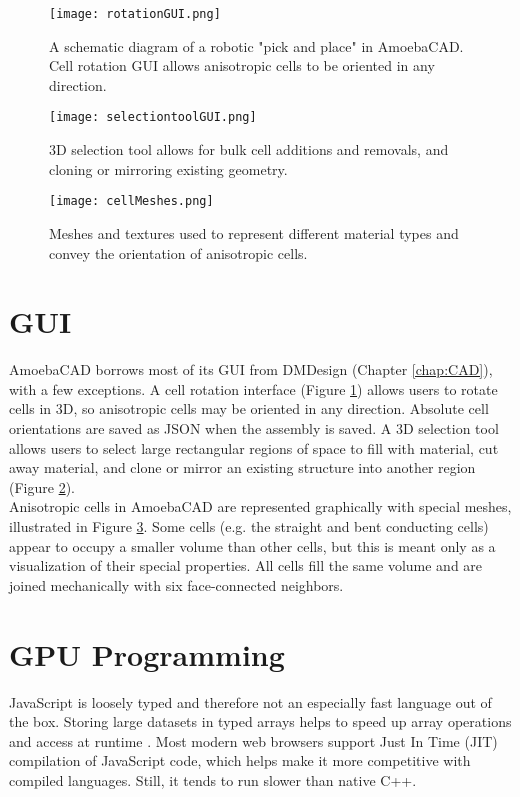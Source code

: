 {\begin{figure}
  \texttt{[image: rotationGUI.png]}
  \caption{A schematic diagram of a robotic "pick and place" in AmoebaCAD.  Cell rotation GUI allows anisotropic cells to be oriented in any direction.}
  \label{fig:rotationGUI}
\end{figure}

\begin{figure}
  \texttt{[image: selectiontoolGUI.png]}
  \caption{3D selection tool allows for bulk cell additions and removals, and cloning or mirroring existing geometry.}
  \label{fig:selectiontoolGUI}
\end{figure}

\begin{figure}
  \texttt{[image: cellMeshes.png]}
  \caption{Meshes and textures used to represent different material types and convey the orientation of anisotropic cells.}
  \label{fig:cellMeshes}
\end{figure}

\section{GUI}

AmoebaCAD borrows most of its GUI from DMDesign (Chapter \ref{chap:CAD}), with a few exceptions.  A cell rotation interface (Figure \ref{fig:rotationGUI}) allows users to rotate cells in 3D, so anisotropic cells may be oriented in any direction.  Absolute cell orientations are saved as JSON when the assembly is saved.  A 3D selection tool allows users to select large rectangular regions of space to fill with material, cut away material, and clone or mirror an existing structure into another region (Figure \ref{fig:selectiontoolGUI}).\\

Anisotropic cells in AmoebaCAD are represented graphically with special meshes, illustrated in Figure \ref{fig:cellMeshes}.  Some cells (e.g. the straight and bent conducting cells) appear to occupy a smaller volume than other cells, but this is meant only as a visualization of their special properties.  All cells fill the same volume and are joined mechanically with six face-connected neighbors.

\section{GPU Programming}

JavaScript is loosely typed and therefore not an especially fast language out of the box.  Storing large datasets in typed arrays helps to speed up array operations and access at runtime \cite{Network}.  Most modern web browsers support Just In Time (JIT) compilation of JavaScript code, which helps make it more competitive with compiled languages.    Still, it tends to run slower than native C++.\\

}
